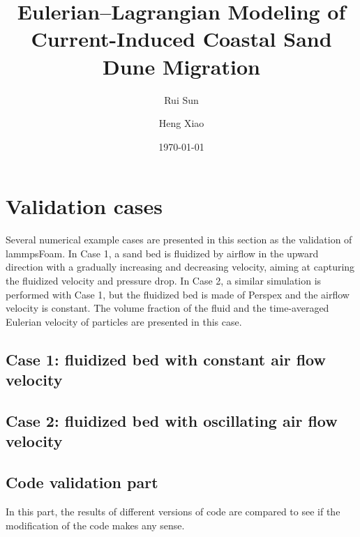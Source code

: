 \documentclass[11pt]{article}
\title{Eulerian--Lagrangian Modeling of Current-Induced Coastal Sand Dune Migration}
\author{Rui Sun \and Heng Xiao}
\date{\today}
\begin{document}
\maketitle

\section{Validation cases}

Several numerical example cases are presented in this section as the validation of lammpsFoam. In
Case 1, a sand bed is fluidized by airflow in the upward direction with a gradually increasing and
decreasing velocity, aiming at capturing the fluidized velocity and pressure drop. In Case 2, a
similar simulation is performed with Case 1, but the fluidized bed is made of Perspex and the
airflow velocity is constant. The volume fraction of the fluid and the time-averaged Eulerian
velocity of particles are presented in this case.

\subsection{Case 1: fluidized bed with constant air flow velocity}

\subsection{Case 2: fluidized bed with oscillating air flow velocity}

\subsection{Code validation part}

In this part, the results of different versions of code are compared to see if the modification of
the code makes any sense.
\end{document}
